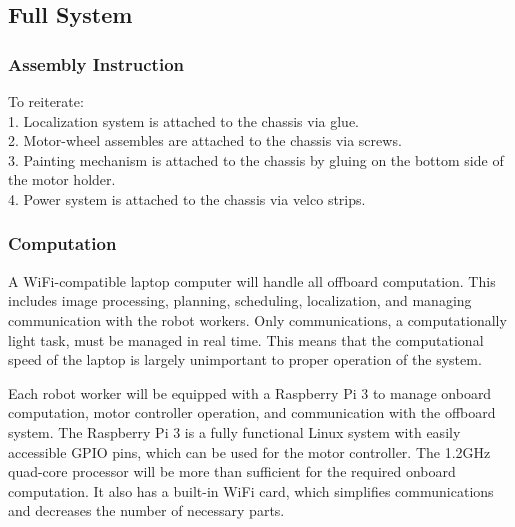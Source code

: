 
\subsection{Full System}
\label{sec:hardware_full_system}

\subsubsection{Assembly Instruction}
\label{sec:full_assemb}
To reiterate:\\
1. Localization system is attached to the chassis via glue.\\
2. Motor-wheel assembles are attached to the chassis via screws.\\
3. Painting mechanism is attached to the chassis by gluing on the bottom side of the motor holder.\\
4. Power system is attached to the chassis via velco strips.

\subsubsection{Computation}
\label{sec:full_computation}
A WiFi-compatible laptop computer will handle all offboard computation. This includes image processing, planning, scheduling, localization, and managing communication with the robot workers. Only communications, a computationally light task, must be managed in real time. This means that the computational speed of the laptop is largely unimportant to proper operation of the system. 

Each robot worker will be equipped with a Raspberry Pi 3 to manage onboard computation, motor controller operation, and communication with the offboard system. The Raspberry Pi 3 is a fully functional Linux system with easily accessible GPIO pins, which can be used for the motor controller. The 1.2GHz quad-core processor will be more than sufficient for the required onboard computation. It also has a built-in WiFi card, which simplifies communications and decreases the number of necessary parts. 